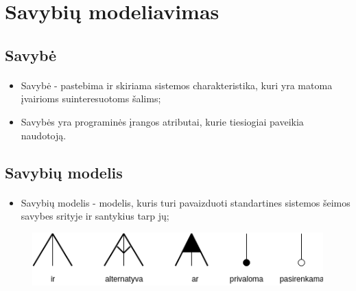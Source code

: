 \documentclass{beamer}
\begin{document}
\section{Savybių modeliavimas}
\subsection{Savybė}

\begin{frame}{\insertsection}
\framesubtitle{\insertsubsection}
\vspace{-20.5pt}
    \begin{itemize}
        \item Savybė -  pastebima ir skiriama sistemos charakteristika, kuri yra matoma įvairioms suinteresuotoms šalims;
        \item Savybės yra programinės įrangos atributai, kurie tiesiogiai paveikia
        naudotoją.
    \end{itemize}

\end{frame}

\subsection{Savybių modelis}
\begin{frame}{\insertsection}
\framesubtitle{\insertsubsection}
\vspace{-20.5pt}
\begin{itemize}
    \item Savybių modelis - modelis, kuris turi pavaizduoti standartines sistemos šeimos savybes srityje ir santykius tarp jų;
\end{itemize}

\bigbreak
\bigbreak

\begin{figure}[H]
    \centering
    \includegraphics[scale=0.5]{../img/feature_model_rules}
    
\end{figure}
\end{frame}
\end{document}
